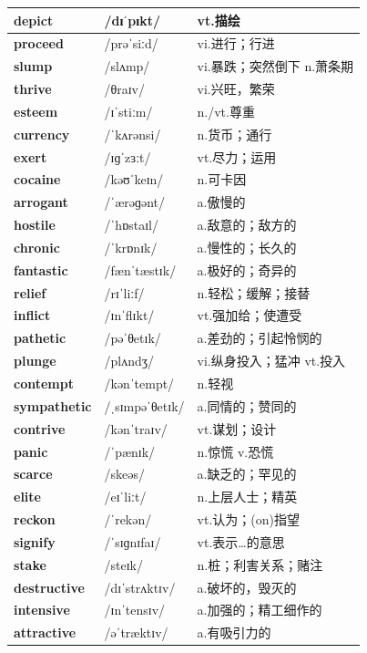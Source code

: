\documentclass[14pt,a4paper]{extarticle}
\begin{document}
\begin{longtable}{ p{} p{} p{} }
\textbf{depict} & /dɪˈpɪkt/ & vt.描绘 \\ \hline
\textbf{proceed} & /prəˈsiːd/ & vi.进行；行进 \\ \hline
\textbf{slump} & /slʌmp/ & vi.暴跌；突然倒下 \quad n.萧条期 \\ \hline
\textbf{thrive} & /θraɪv/ & vi.兴旺，繁荣 \\ \hline
\textbf{esteem} & /ɪˈstiːm/ & n./vt.尊重 \\ \hline
\textbf{currency} & /ˈkʌrənsi/ & n.货币；通行 \\ \hline
\textbf{exert} & /ɪɡˈzɜːt/ & vt.尽力；运用 \\ \hline
\textbf{cocaine} & /kəʊˈkeɪn/ & n.可卡因 \\ \hline
\textbf{arrogant} & /ˈærəɡənt/ & a.傲慢的 \\ \hline
\textbf{hostile} & /ˈhɒstaɪl/ & a.敌意的；敌方的 \\ \hline
\textbf{chronic} & /ˈkrɒnɪk/ & a.慢性的；长久的 \\ \hline
\textbf{fantastic} & /fænˈtæstɪk/ & a.极好的；奇异的 \\ \hline
\textbf{relief} & /rɪˈliːf/ & n.轻松；缓解；接替 \\ \hline
\textbf{inflict} & /ɪnˈflɪkt/ & vt.强加给；使遭受 \\ \hline
\textbf{pathetic} & /pəˈθetɪk/ & a.差劲的；引起怜悯的 \\ \hline
\textbf{plunge} & /plʌndʒ/ & vi.纵身投入；猛冲 \quad vt.投入 \\ \hline
\textbf{contempt} & /kənˈtempt/ & n.轻视 \\ \hline
\textbf{sympathetic} & /ˌsɪmpəˈθetɪk/ & a.同情的；赞同的 \\ \hline
\textbf{contrive} & /kənˈtraɪv/ & vt.谋划；设计 \\ \hline
\textbf{panic} & /ˈpænɪk/ & n.惊慌 \quad v.恐慌 \\ \hline
\textbf{scarce} & /skeəs/ & a.缺乏的；罕见的 \\ \hline
\textbf{elite} & /eɪˈliːt/ & n.上层人士；精英 \\ \hline
\textbf{reckon} & /ˈrekən/ & vt.认为；(on)指望 \\ \hline
\textbf{signify} & /ˈsɪɡnɪfaɪ/ & vt.表示…的意思 \\ \hline
\textbf{stake} & /steɪk/ & n.桩；利害关系；赌注 \\ \hline
\textbf{destructive} & /dɪˈstrʌktɪv/ & a.破坏的，毁灭的 \\ \hline
\textbf{intensive} & /ɪnˈtensɪv/ & a.加强的；精工细作的 \\ \hline
\textbf{attractive} & /əˈtræktɪv/ & a.有吸引力的 \\ \hline
\end{longtable}
\end{document}
